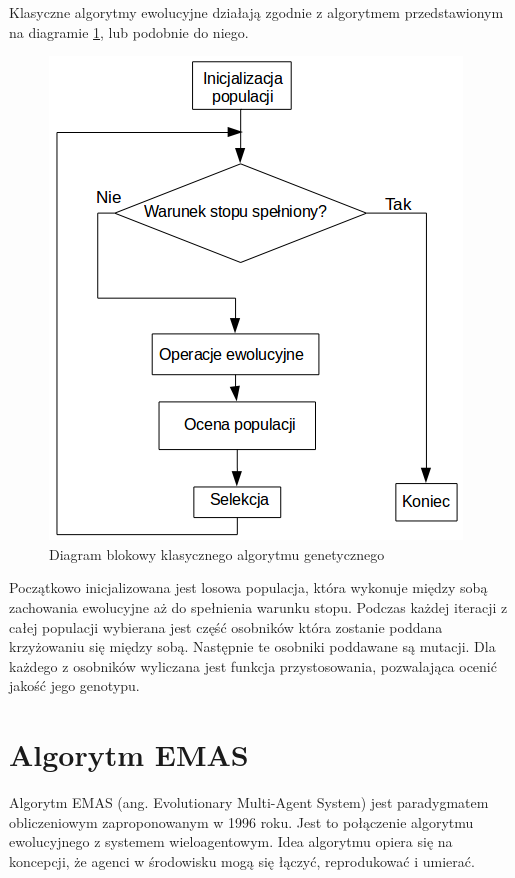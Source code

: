 Klasyczne algorytmy ewolucyjne działają zgodnie z algorytmem przedstawionym na diagramie \ref{fig:GAdiagram}, lub podobnie do niego. 

\begin{figure}[H]
\begin{center} 
\includegraphics[scale=0.6]{tresc/pics/GAdiagram.png}
\caption{Diagram blokowy klasycznego algorytmu genetycznego}
\label{fig:GAdiagram}
\end{center}
\end{figure}

Początkowo inicjalizowana jest losowa populacja, która wykonuje między sobą zachowania ewolucyjne aż do spełnienia warunku stopu. Podczas każdej iteracji z całej populacji wybierana jest część osobników która zostanie poddana krzyżowaniu się między sobą. Następnie te osobniki poddawane są mutacji. Dla każdego z osobników wyliczana jest funkcja przystosowania, pozwalająca ocenić jakość jego genotypu.

\section{Algorytm EMAS}

Algorytm EMAS (ang. Evolutionary Multi-Agent System) jest paradygmatem obliczeniowym zaproponowanym w 1996 roku\cite{emas1}. Jest to połączenie algorytmu ewolucyjnego z systemem wieloagentowym. Idea algorytmu opiera się na koncepcji, że agenci w środowisku mogą się łączyć, reprodukować i umierać. 

